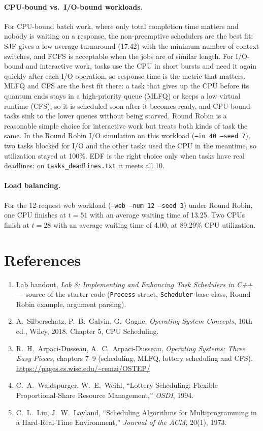 \documentclass[11pt]{article}
\begin{document}
\paragraph{CPU-bound vs.\ I/O-bound workloads.} For CPU-bound batch work, where only total
completion time matters and nobody is waiting on a response, the non-preemptive schedulers
are the best fit: SJF gives a low average turnaround (17.42) with the minimum number of
context switches, and FCFS is acceptable when the jobs are of similar length. For
I/O-bound and interactive work, tasks use the CPU in short bursts and need it again quickly
after each I/O operation, so response time is the metric that matters. MLFQ and CFS are the
best fit there: a task that gives up the CPU before its quantum ends stays in a
high-priority queue (MLFQ) or keeps a low virtual runtime (CFS), so it is scheduled soon
after it becomes ready, and CPU-bound tasks sink to the lower queues without being starved.
Round Robin is a reasonable simple choice for interactive work but treats both kinds of
task the same. In the Round Robin I/O simulation on this workload (\texttt{--io 40
--seed 7}), two tasks blocked for I/O and the other tasks used the CPU in the meantime, so
utilization stayed at 100\%. EDF is the right choice only when tasks have real deadlines: on
\texttt{tasks\_deadlines.txt} it meets all 10.

\paragraph{Load balancing.} For the 12-request web workload (\texttt{--web --num 12
--seed 3}) under Round Robin, one CPU finishes at $t = 51$ with an average waiting time of
13.25. Two CPUs finish at $t = 28$ with an average waiting time of 4.00, at 89.29\% CPU
utilization.

\section{References}
\begin{enumerate}[leftmargin=*]
  \item Lab handout, \emph{Lab 8: Implementing and Enhancing Task Schedulers in C++} ---
        source of the starter code (\texttt{Process} struct, \texttt{Scheduler} base class,
        Round Robin example, argument parsing).
  \item A.~Silberschatz, P.~B.~Galvin, G.~Gagne, \emph{Operating System Concepts}, 10th
        ed., Wiley, 2018. Chapter 5, CPU Scheduling.
  \item R.~H.~Arpaci-Dusseau, A.~C.~Arpaci-Dusseau, \emph{Operating Systems: Three Easy
        Pieces}, chapters 7--9 (scheduling, MLFQ, lottery scheduling and CFS).
        \url{https://pages.cs.wisc.edu/~remzi/OSTEP/}
  \item C.~A.~Waldspurger, W.~E.~Weihl, ``Lottery Scheduling: Flexible Proportional-Share
        Resource Management,'' \emph{OSDI}, 1994.
  \item C.~L.~Liu, J.~W.~Layland, ``Scheduling Algorithms for Multiprogramming in a
        Hard-Real-Time Environment,'' \emph{Journal of the ACM}, 20(1), 1973.
\end{enumerate}
\end{document}
